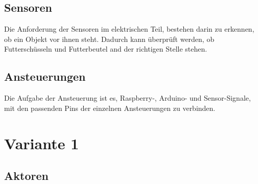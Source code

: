 \subsection{Sensoren}
Die Anforderung der Sensoren im elektrischen Teil, bestehen darin zu erkennen, ob ein Objekt vor ihnen steht. Dadurch kann überprüft werden, ob Futterschüsseln und Futterbeutel and der richtigen Stelle stehen.
\subsection{Ansteuerungen}
Die Aufgabe der Ansteuerung ist es, Raspberry-, Arduino- und Sensor-Signale, mit den passenden Pins der einzelnen Ansteuerungen zu verbinden.
\newpage
\section{Variante 1}
\subsection{Aktoren}
